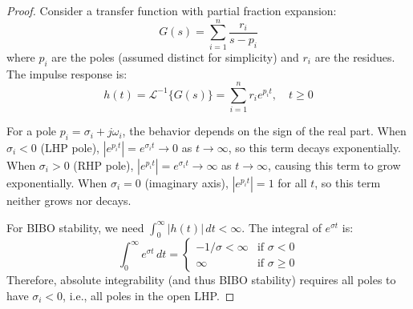 \begin{proof}
Consider a transfer function with partial fraction expansion:
\begin{equation}
G(s) = \sum_{i=1}^n \frac{r_i}{s - p_i}
\end{equation}
where $p_i$ are the poles (assumed distinct for simplicity) and $r_i$ are the residues. The impulse response is:
\begin{equation}
h(t) = \mathcal{L}^{-1}\{G(s)\} = \sum_{i=1}^n r_i e^{p_i t}, \quad t \geq 0
\end{equation}

For a pole $p_i = \sigma_i + j\omega_i$, the behavior depends on the sign of the real part. When $\sigma_i < 0$ (LHP pole), $|e^{p_i t}| = e^{\sigma_i t} \to 0$ as $t \to \infty$, so this term decays exponentially. When $\sigma_i > 0$ (RHP pole), $|e^{p_i t}| = e^{\sigma_i t} \to \infty$ as $t \to \infty$, causing this term to grow exponentially. When $\sigma_i = 0$ (imaginary axis), $|e^{p_i t}| = 1$ for all $t$, so this term neither grows nor decays.

For BIBO stability, we need $\int_0^\infty |h(t)| \, dt < \infty$. The integral of $e^{\sigma t}$ is:
\begin{equation}
\int_0^\infty e^{\sigma t} \, dt = \begin{cases}
-1/\sigma < \infty & \text{if } \sigma < 0 \\
\infty & \text{if } \sigma \geq 0
\end{cases}
\end{equation}
Therefore, absolute integrability (and thus BIBO stability) requires all poles to have $\sigma_i < 0$, i.e., all poles in the open LHP.
\end{proof}

